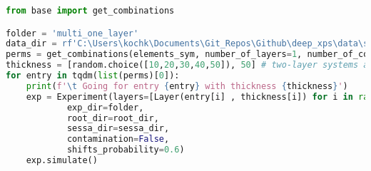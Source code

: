 \begin{lstlisting}[language=Python]
from base import get_combinations

folder = 'multi_one_layer'
data_dir = rf'C:\Users\kochk\Documents\Git_Repos\Github\deep_xps\data\simulation_data\{folder}'
perms = get_combinations(elements_sym, number_of_layers=1, number_of_combinations=30_000, lower=2, upper=4) # get one layer
thickness = [random.choice([10,20,30,40,50]), 50] # two-layer systems always have second layer of 50 Angstrom
for entry in tqdm(list(perms)[0]):
    print(f'\t Going for entry {entry} with thickness {thickness}')
    exp = Experiment(layers=[Layer(entry[i] , thickness[i]) for i in range(len(entry))],
            exp_dir=folder,
            root_dir=root_dir,
            sessa_dir=sessa_dir,
            contamination=False,
            shifts_probability=0.6)
    exp.simulate()
\end{lstlisting}
